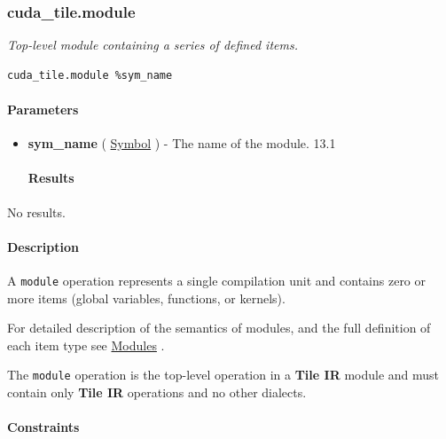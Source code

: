 \documentclass{article}
\begin{document}
\subsubsection{cuda\_tile.module}

\textit{Top-level module containing a series of defined items.}


\begin{lstlisting}
cuda_tile.module %sym_name
\end{lstlisting}

\paragraph{Parameters}

\begin{itemize}
\item \textbf{sym\_name} ( \href{https://docs.nvidia.com/cuda/tile-ir/latest/sections/operations.html#type-symbol}{Symbol} ) - The name of the module. 13.1


\paragraph{Results}

\end{itemize}
No results.



\paragraph{Description}

A \texttt{module} operation represents a single compilation unit and contains zero or more items (global variables, functions, or kernels).


For detailed description of the semantics of modules, and the full definition of each item type see \href{https://docs.nvidia.com/cuda/tile-ir/latest/sections/semantics.html#sub-sec-modules}{Modules} .


The \texttt{module} operation is the top-level operation in a \textbf{Tile IR} module and must contain only \textbf{Tile IR} operations and no other dialects.



\paragraph{Constraints}
\end{document}
